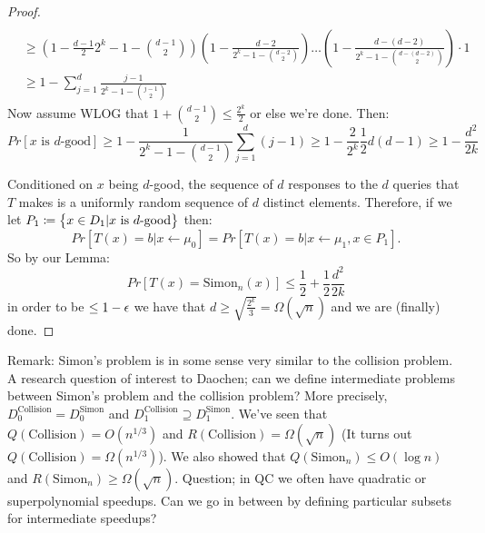 \begin{proof}
\begin{align*}
        \\ &\geq \left(1-\frac{d-1}{2}{2^k-1-\binom{d-1}{2}}\right)\left(1 - \frac{d-2}{2^k-1-\binom{d-2}{2}}\right)\ldots \left(1 - \frac{d-(d-2)}{2^k-1-\binom{d-(d-2)}{2}}\right) \cdot 1
        \\ &\geq 1 - \sum_{j=1}^{d}\frac{j-1}{2^k-1-\binom{j-1}{2}}
    \end{align*}
    Now assume WLOG that $1 + \binom{d-1}{2} \leq \frac{2^k}{2}$ or else we're done. Then:
    \begin{equation}
        Pr[\text{$x$ is $d$-good}] \geq 1 - \frac{1}{2^k-1-\binom{d-1}{2}}\sum_{j=1}^d (j-1) \geq 1 - \frac{2}{2^k}\frac{1}{2}d(d-1) \geq 1 - \frac{d^2}{2k}
    \end{equation}

    Conditioned on $x$ being $d$-good, the sequence of $d$ responses to the $d$ queries that $T$ makes is a uniformly random sequence of $d$ distinct elements. Therefore, if we let $P_1 \coloneqq \set{x \in D_1 \vert \text{$x$ is $d$-good}}$ then:
    \begin{equation}
        Pr[T(x) = b \vert x \leftarrow \mu_0] = Pr[T(x) = b \vert x \leftarrow \mu_1, x \in P_1]. 
    \end{equation}
    So by our Lemma:
    \begin{equation}
        Pr[T(x) = \text{Simon}_n(x)] \leq \frac{1}{2} + \frac{1}{2}\frac{d^2}{2k}
    \end{equation}
    in order to be $\leq 1 - \epsilon$ we have that $d \geq \sqrt{\frac{2^k}{3}} = \Omega(\sqrt{n})$ and we are (finally) done.
\end{proof}

Remark: Simon's problem is in some sense very similar to the collision problem. A research question of interest to Daochen; can we define intermediate problems between Simon's problem and the collision problem? More precisely, $D_0^{\text{Collision}} = D_0^{\text{Simon}}$ and $D_1^{\text{Collision}} \supseteq D_1^{\text{Simon}}$. We've seen that $Q(\text{Collision}) = O(n^{1/3})$ and $R(\text{Collision}) = \Omega(\sqrt{n})$ (It turns out $Q(\text{Collision}) = \Omega(n^{1/3})$). We also showed that $Q(\text{Simon}_n) \leq O(\log n)$ and $R(\text{Simon}_n) \geq \Omega(\sqrt{n})$. Question; in QC we often have quadratic or superpolynomial speedups. Can we go in between by defining particular subsets for intermediate speedups?
